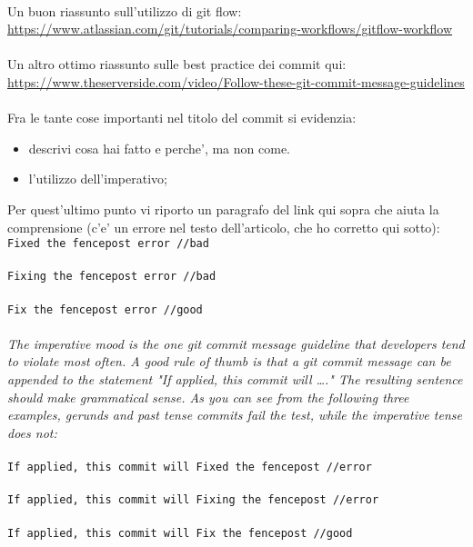 \\
Un buon riassunto sull'utilizzo di git flow: \\
\url{https://www.atlassian.com/git/tutorials/comparing-workflows/gitflow-workflow}\\
\\
Un altro ottimo riassunto sulle best practice dei commit qui: \\
\url{https://www.theserverside.com/video/Follow-these-git-commit-message-guidelines}\\
\\
Fra le tante cose importanti nel titolo del commit si evidenzia:
\begin{itemize}
\item descrivi cosa hai fatto e perche', ma non come.
\item l'utilizzo dell'imperativo;
\end{itemize}
Per quest'ultimo punto vi riporto un paragrafo del link qui sopra che aiuta la comprensione (c'e' un errore nel testo dell'articolo, che ho corretto qui sotto):
\\
\texttt{Fixed the fencepost error //bad \\
\\
Fixing the fencepost error //bad \\
\\
Fix the fencepost error //good} \\
\\
\textit{The imperative mood is the one git commit message guideline that developers tend to violate most often. A good rule of thumb is that a git commit message can be appended to the statement "If applied, this commit will …." The resulting sentence should make grammatical sense. As you can see from the following three examples, gerunds and past tense commits fail the test, while the imperative tense does not:}\\
\\
\texttt{If applied, this commit will Fixed the fencepost //error\\
\\
If applied,  this commit will Fixing the fencepost //error\\
\\
If applied,  this commit will Fix the fencepost //good}\\
